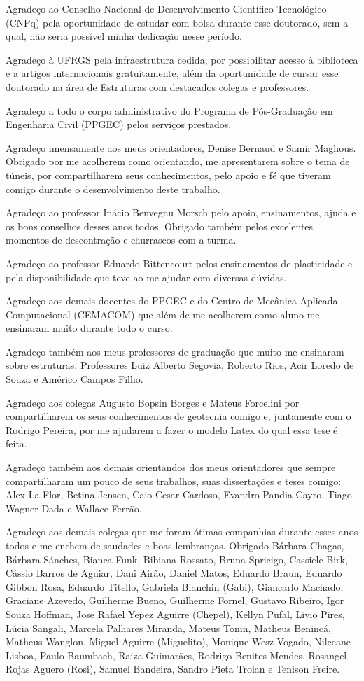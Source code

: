 Agradeço ao Conselho Nacional de Desenvolvimento Científico Tecnológico (CNPq) pela oportunidade de estudar com bolsa durante esse doutorado, sem a qual, não seria possível minha dedicação nesse período.

Agradeço à UFRGS pela infraestrutura cedida, por possibilitar acesso à biblioteca e a artigos internacionais gratuitamente, além da oportunidade de cursar esse doutorado na área de Estruturas com destacados colegas e professores.

Agradeço a todo o corpo administrativo do Programa de Pós-Graduação em Engenharia Civil (PPGEC) pelos serviços prestados.

Agradeço imensamente aos meus orientadores, Denise Bernaud e Samir Maghous. Obrigado por me acolherem como orientando, me apresentarem sobre o tema de túneis, por compartilharem seus conhecimentos, pelo apoio e fé que tiveram comigo durante o desenvolvimento deste trabalho.

Agradeço ao professor Inácio Benvegnu Morsch pelo apoio, ensinamentos, ajuda e os bons conselhos desses anos todos. Obrigado também pelos excelentes momentos de descontração e churrascos com a turma.

Agradeço ao professor Eduardo Bittencourt pelos ensinamentos de plasticidade e pela disponibilidade que teve ao me ajudar com diversas dúvidas.

Agradeço aos demais docentes do PPGEC e do Centro de Mecânica Aplicada Computacional (CEMACOM) que além de me acolherem como aluno me ensinaram muito durante todo o curso.

Agradeço também aos meus professores de graduação que muito me ensinaram sobre estruturas. Professores Luiz Alberto Segovia, Roberto Rios, Acir Loredo de Souza e Américo Campos Filho.

Agradeço aos colegas Augusto Bopsin Borges e Mateus Forcelini por compartilharem os seus conhecimentos de geotecnia comigo e, juntamente com o Rodrigo Pereira, por me ajudarem a fazer o modelo Latex do qual essa tese é feita.

Agradeço também aos demais orientandos dos meus orientadores que sempre compartilharam um pouco de seus trabalhos, suas dissertações e teses comigo: Alex La Flor,  Betina Jensen, Caio Cesar Cardoso, Evandro Pandia Cayro, Tiago Wagner Dada e Wallace Ferrão. 

Agradeço aos demais colegas que me foram ótimas companhias durante esses anos todos e me enchem de saudades e boas lembranças. Obrigado Bárbara Chagas, Bárbara Sánches, Bianca Funk, Bibiana Rossato, Bruna Spricigo, Cassiele Birk, Cássio Barros de Aguiar, Dani Airão, Daniel Matos, Eduardo Braun, Eduardo Gibbon Rosa, Eduardo Titello, Gabriela Bianchin (Gabi), Giancarlo Machado, Graciane Azevedo, Guilherme Bueno, Guilherme Fornel, Gustavo Ribeiro, Igor Souza Hoffman, Jose Rafael Yepez Aguirre (Chepel), Kellyn Pufal, Livio Pires, Lúcia Sangali, Marcela Palhares Miranda, Mateus Tonin, Matheus Benincá, Matheus Wanglon, Miguel Aguirre (Miguelito), Monique Wesz Vogado, Nilceane Lisboa, Paulo Baumbach, Raiza Guimarães, Rodrigo Benites Mendes, Rosangel Rojas Aguero (Rosi), Samuel Bandeira, Sandro Pieta Troian e Tenison Freire.

